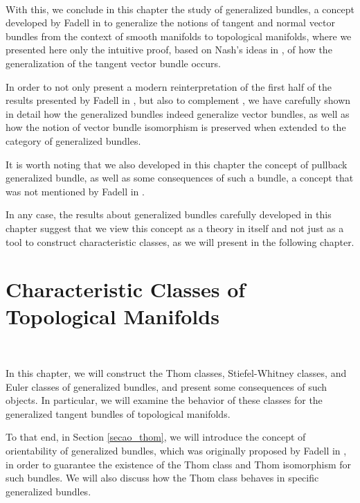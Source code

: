 \documentclass[12pt,oneside]{book}
\begin{document}
    \
    
    With this, we conclude in this chapter the study of generalized bundles, a concept developed by Fadell in \cite{fadell_1} to generalize the notions of tangent and normal vector bundles from the context of smooth manifolds to topological manifolds, where we presented here only the intuitive proof, based on Nash's ideas in \cite{nash}, of how the generalization of the tangent vector bundle occurs.
    
    In order to not only present a modern reinterpretation of the first half of the results presented by Fadell in \cite{fadell_1}, but also to complement \cite{fadell_1}, we have carefully shown in detail how the generalized bundles indeed generalize vector bundles, as well as how the notion of vector bundle isomorphism is preserved when extended to the category of generalized bundles.
    
    It is worth noting that we also developed in this chapter the concept of pullback generalized bundle, as well as some consequences of such a bundle, a concept that was not mentioned by Fadell in \cite{fadell_1}.
    
    In any case, the results about generalized bundles carefully developed in this chapter suggest that we view this concept as a theory in itself and not just as a tool to construct characteristic classes, as we will present in the following chapter.
    


    \chapter{Characteristic Classes of Topological Manifolds}\label{cap_clas_carac}
    \thispagestyle{empty}
    
    \
    
    In this chapter, we will construct the Thom classes, Stiefel-Whitney classes, and 
    Euler classes of generalized bundles, and present some consequences of such objects. 
    In particular, we will examine the behavior of these classes for the generalized tangent bundles of 
    topological manifolds.
    
    To that end, in Section \ref{secao_thom}, we will introduce the concept of orientability of generalized bundles, which was originally 
    proposed by Fadell in \cite{fadell_1}, in order to guarantee the existence of the Thom class and Thom isomorphism for such bundles. 
    We will also discuss how the Thom class behaves in specific generalized bundles.
    
\end{document}
